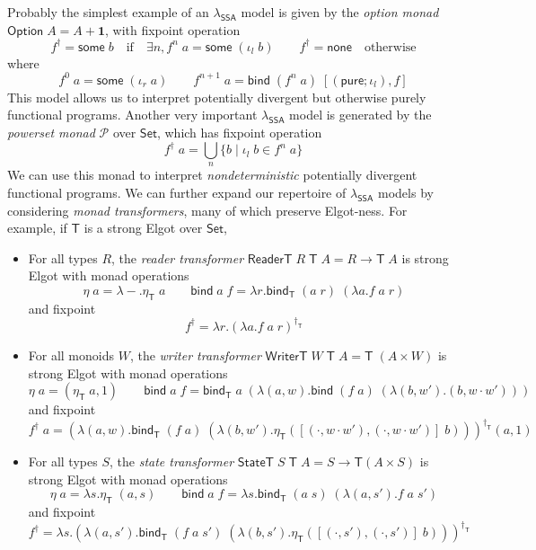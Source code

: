 \documentclass[acmsmall,screen,review]{acmart}
\newcommand{\mc}[1]{\ensuremath{\mathcal{#1}}}
\newcommand{\mb}[1]{\ensuremath{\mathbf{#1}}}
\newcommand{\ms}[1]{\ensuremath{\mathsf{#1}}}
\newcommand{\isotopessa}{\(\lambda_{\ms{SSA}}\)}
\begin{document}
Probably the simplest example of an \isotopessa{} model is given by the
\emph{option monad} $\ms{Option}\;A = A + \mb{1}$, with fixpoint operation
$$
  f^\dagger = \ms{some}\;b \quad \text{if} \quad \exists n, f^n\;a = \ms{some}\;(\iota_l\;b)
  \qquad
  f^\dagger = \ms{none} \quad \text{otherwise}
$$
where
$$
  f^0\;a = \ms{some}\;(\iota_r\;a) \qquad
  f^{n + 1}\;a = \ms{bind}\;(f^{n}\;a)\;[(\ms{pure};\iota_l), f] 
$$
This model allows us to interpret potentially divergent but otherwise purely functional programs.
Another very important \isotopessa{} model is generated by the \emph{powerset monad} $\mc{P}$ over
\ms{Set}, which has fixpoint operation
$$
  f^\dagger\;a = \bigcup_n\{b \mid \iota_l\;b \in f^n\;a\}
$$
We can use this monad to interpret \emph{nondeterministic} potentially divergent functional
programs. We can further expand our repertoire of \isotopessa{} models by considering \emph{monad
transformers}, many of which preserve Elgot-ness. For example, if $\ms{T}$ is a strong Elgot over
\ms{Set},
\begin{itemize}
  \item For all types $R$, the \emph{reader transformer}
  $\ms{ReaderT}\;R\;\ms{T}\;A = R \to \ms{T}\;A$ is strong Elgot 
  with monad operations
  \begin{equation}
    \eta\;a = \lambda - . \eta_{\ms{T}}\;a \qquad
    \ms{bind}\;a\;f = \lambda r. \ms{bind}_{\ms{T}}\;(a\;r)\;(\lambda a. f\;a\;r)
  \end{equation}
  and fixpoint
  \begin{equation}
    f^\dagger = \lambda r.(\lambda a. f\;a\;r)^{\dagger_{\ms{T}}} 
  \end{equation}
  \item For all monoids $W$, the \emph{writer transformer}
  $\ms{WriterT}\;W\;\ms{T}\;A = \ms{T}\;(A \times W)$ is strong Elgot 
  with monad operations
  \begin{equation}
    \eta\;a = (\eta_{\ms{T}}\;a, 1) \qquad
    \ms{bind}\;a\;f = \ms{bind}_{\ms{T}}\;a\;(\lambda (a, w). 
      \ms{bind}\;(f\;a)\;(\lambda (b, w') . (b, w \cdot w')))
  \end{equation}
  and fixpoint
  \begin{equation}
    f^\dagger\;a = (
        \lambda (a, w). \ms{bind}_{\ms{T}}\;(f\;a)\;
          (\lambda (b, w') . \eta_{\ms{T}}([(\cdot, w \cdot w'), (\cdot, w \cdot w')]\;b))
      )^{\dagger_{\ms{T}}}
      (a, 1)
  \end{equation}
  \item For all types $S$, the \emph{state transformer}
  $\ms{StateT}\;S\;\ms{T}\;A = S \to \ms{T}(A \times S)$ is strong Elgot 
  with monad operations
  \begin{equation}
    \eta\;a = \lambda s. \eta_{\ms{T}}\;(a, s) \qquad
    \ms{bind}\;a\;f = \lambda s. \ms{bind}_{\ms{T}}\;(a\;s)\;(\lambda (a, s'). f\;a\;s')
  \end{equation}
  and fixpoint
  \begin{equation}
    f^\dagger = \lambda s.(\lambda (a, s'). 
      \ms{bind}_{\ms{T}}\;(f\;a\;s')\;(\lambda (b, s') . 
        \eta_{\ms{T}}([(\cdot, s'), (\cdot, s')]\;b)))^{\dagger_{\ms{T}}}
  \end{equation}
\end{itemize}
\end{document}
